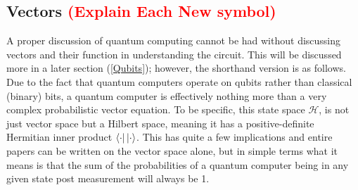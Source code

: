 \documentclass[a4paper]{article}
\begin{document}
\subsection{Vectors \textcolor{red}{(Explain Each New symbol)}}
\label{THISNEEDSACCURACYREVIEW} %
A proper discussion of quantum computing cannot be had without discussing vectors and their function in understanding the circuit.  This will be discussed more in a later section (\ref{Qubits}); however, the shorthand version is as follows.  Due to the fact that quantum computers operate on qubits rather than classical (binary) bits, a quantum computer is effectively nothing more than a very complex probabilistic vector equation. To be specific, this state space $\mathcal{H}$, is not just vector space but a Hilbert space, meaning it has a positive-definite Hermitian inner product $\left\langle{\cdot}\right\vert\left\vert{\cdot}\right\rangle$.  This has quite a few implications and entire papers can be written on the vector space alone, but in simple terms what it means is that the sum of the probabilities of a quantum computer being in any given state post measurement will always be 1.
\end{document}
